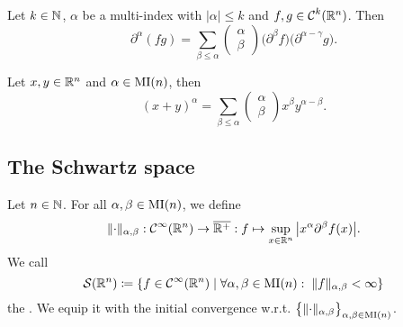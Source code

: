 \begin{proposition}
Let $k\in \mathbb{N}$, $\alpha$ be a multi-index with $|\alpha| \leq k$ and $f,g\in \operatorname{\mathcal{C}}^k(\mathbb{R}^n)$. Then
\[ \partial^\alpha(fg) = \sum_{\beta\leq \alpha}\begin{pmatrix}
\alpha \\ \beta
\end{pmatrix}\big(\partial^\beta f\big)\big(\partial^{\alpha - \gamma} g\big). \]
\end{proposition}

\begin{proposition}
Let $x,y\in \mathbb{R}^n$ and $\alpha\in\operatorname{MI}(n)$, then
\[ (x+y)^\alpha = \sum_{\beta \leq \alpha}\begin{pmatrix}
\alpha \\ \beta
\end{pmatrix}x^\beta y^{\alpha - \beta}. \]
\end{proposition}

\subsection{The Schwartz space}
\begin{definition}
Let $n\in \mathbb{N}$. For all $\alpha, \beta\in \operatorname{MI}(n)$, we define
\[ \lVert\cdot\rVert_{\alpha, \beta}: \operatorname{\mathcal{C}}^\infty(\mathbb{R}^n)\to \overline{\mathbb{R}^+}: f\mapsto \sup_{x\in \mathbb{R}^n}\big|x^\alpha\partial^\beta f(x)\big|. \]
We call
\[ \Schwartz(\R^n) \defeq \setbuilder{f\in \cont^\infty(\R^n)}{\forall \alpha,\beta\in\multiIndex(n):\;\norm{f}_{\alpha,\beta}<\infty} \]
the . We equip it with the initial convergence w.r.t. $\big\{\lVert\cdot\rVert_{\alpha, \beta}\big\}_{\alpha,\beta\in \operatorname{MI}(n)}$.
\end{definition}

